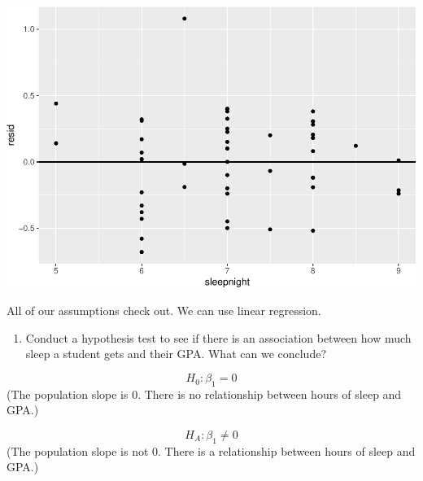 \documentclass[]{article}
\newenvironment{Shaded}{\begin{snugshade}}{\end{snugshade}}
\newcommand{\DataTypeTok}[1]{\textcolor[rgb]{0.13,0.29,0.53}{#1}}
\newcommand{\DecValTok}[1]{\textcolor[rgb]{0.00,0.00,0.81}{#1}}
\newcommand{\KeywordTok}[1]{\textcolor[rgb]{0.13,0.29,0.53}{\textbf{#1}}}
\newcommand{\NormalTok}[1]{#1}
\newcommand{\OperatorTok}[1]{\textcolor[rgb]{0.81,0.36,0.00}{\textbf{#1}}}
\newcommand{\StringTok}[1]{\textcolor[rgb]{0.31,0.60,0.02}{#1}}
\providecommand{\tightlist}{%
  \setlength{\itemsep}{0pt}\setlength{\parskip}{0pt}}
\begin{document}
\begin{Shaded}
\end{Shaded}

\includegraphics{lab-8-regression_files/figure-latex/unnamed-chunk-10-1.pdf}

All of our assumptions check out. We can use linear regression.

\newpage

\begin{enumerate}
\def\labelenumi{\arabic{enumi}.}
\setcounter{enumi}{7}
\tightlist
\item
  Conduct a hypothesis test to see if there is an association between
  how much sleep a student gets and their GPA. What can we conclude?
\end{enumerate}

\[H_0: \beta_1 = 0 \] (The population slope is 0. There is no
relationship between hours of sleep and GPA.)

\[H_A: \beta_1 \ne 0\] (The population slope is not 0. There is a
relationship between hours of sleep and GPA.)

\begin{Shaded}
\end{Shaded}
\end{document}
